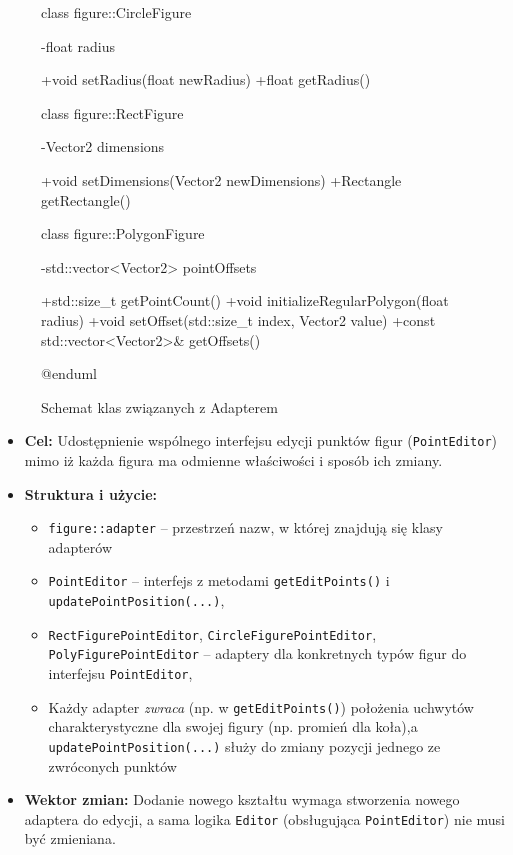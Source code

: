 \documentclass[a4paper,12pt]{article}
\begin{document}
\begin{figure}[H]
\begin{plantuml}
class figure::CircleFigure {
  -float radius

  +void setRadius(float newRadius)
  +float getRadius()
}

class figure::RectFigure {
  -Vector2 dimensions

  +void setDimensions(Vector2 newDimensions)
  +Rectangle getRectangle()
}

class figure::PolygonFigure {
  -std::vector<Vector2> pointOffsets

  +std::size_t getPointCount()
  +void initializeRegularPolygon(float radius)
  +void setOffset(std::size_t index, Vector2 value)
  +const std::vector<Vector2>& getOffsets()
}

@enduml
\end{plantuml}

\caption{Schemat klas związanych z Adapterem}

\end{figure}

\begin{itemize}
    \item \textbf{Cel:} Udostępnienie wspólnego interfejsu edycji punktów figur 
    (\texttt{PointEditor}) mimo iż każda figura ma odmienne właściwości i sposób 
    ich zmiany.
    \item \textbf{Struktura i użycie:}
    \begin{itemize}
      \item \texttt{figure::adapter} -- przestrzeń nazw, w której znajdują się klasy adapterów
      \item \texttt{PointEditor} -- interfejs z metodami \texttt{getEditPoints()}
      i \texttt{updatePointPosition(...)},
      \item \texttt{RectFigurePointEditor}, \texttt{CircleFigurePointEditor}, 
        \texttt{PolyFigurePointEditor} -- adaptery dla konkretnych typów figur do interfejsu \texttt{PointEditor},

      \item Każdy adapter \emph{zwraca} (np. w \texttt{getEditPoints()})
        położenia uchwytów charakterystyczne dla swojej figury (np. promień dla
        koła),a  \verb|updatePointPosition(...)| służy do zmiany pozycji
        jednego ze zwróconych punktów

    \end{itemize}
    \item \textbf{Wektor zmian:} Dodanie nowego kształtu wymaga stworzenia
    nowego adaptera do edycji, a sama logika \texttt{Editor} (obsługująca \texttt{PointEditor})
    nie musi być zmieniana.
\end{itemize}
\end{document}
